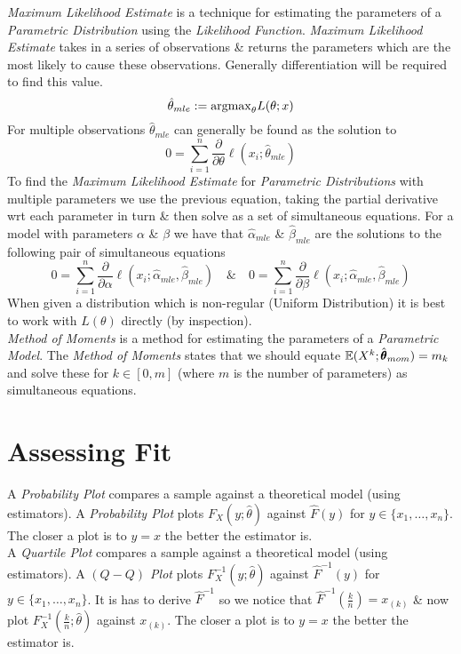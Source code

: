 \documentclass[11pt,a4paper]{article}
\begin{document}
\textit{Maximum Likelihood Estimate} is a technique for estimating the parameters of a \textit{Parametric Distribution} using the \textit{Likelihood Function}. \textit{Maximum Likelihood Estimate} takes in a series of observations \& returns the parameters which are the most likely to cause these observations. Generally differentiation will be required to find this value.
$$\hat{\theta}_{mle}:=\mathrm{argmax}_\theta L(\theta;x)$$
For multiple observations $\hat{\theta}_{mle}$ can generally be found as the solution to
$$0=\sum_{i=1}^n\frac{\partial}{\partial\theta}\ell(x_i;\hat{\theta}_{mle})$$
To find the \textit{Maximum Likelihood Estimate} for \textit{Parametric Distributions} with multiple parameters we use the previous equation, taking the partial derivative wrt each parameter in turn \& then solve as a set of simultaneous equations. For a model with parameters $\alpha$ \& $\beta$ we have that $\hat{\alpha}_{mle}$ \& $\hat{\beta}_{mle}$ are the solutions to the following pair of simultaneous equations
$$0=\sum_{i=1}^n\frac{\partial}{\partial\alpha}\ell(x_i;\hat{\alpha}_{mle},\hat{\beta}_{mle})\quad\&\quad0=\sum_{i=1}^n\frac{\partial}{\partial\beta}\ell(x_i;\hat{\alpha}_{mle},\hat{\beta}_{mle})$$
\NB When given a distribution which is non-regular (\eg Uniform Distribution) it is best to work with $L(\theta)$ directly (by inspection).\\

\textit{Method of Moments} is a method for estimating the parameters of a \textit{Parametric Model}. The \textit{Method of Moments} states that we should equate $\mathbb{E}(X^k;\hat{\pmb{\theta}}_{mom})=m_k$ and solve these for $k\in[0,m]$ (where $m$ is the number of parameters) as simultaneous equations.

\section{Assessing Fit}

A \textit{Probability Plot} compares a sample against a theoretical model (using estimators). A \textit{Probability Plot} plots $F_X(y;\hat{\theta})$ against $\hat{F}(y)$ for $y\in\{x_1,\dots,x_n\}$. The closer a plot is to $y=x$ the better the estimator is.\\

A \textit{Quartile Plot} compares a sample against a theoretical model (using estimators). A \textit{$(Q-Q)$ Plot} plots $F_X^{-1}(y;\hat{\theta})$ against $\hat{F}^{-1}(y)$ for $y\in\{x_1,\dots,x_n\}$. It is has to derive $\hat{F}^{-1}$ so we notice that $\hat{F}^{-1}\left(\frac{k}{n}\right)=x_{(k)}$ \& now plot $F_X^{-1}\left(\frac{k}{n};\hat{\theta}\right)$ against $x_{(k)}$. The closer a plot is to $y=x$ the better the estimator is.\\
\end{document}
